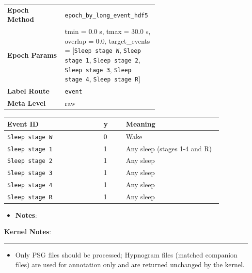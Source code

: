 {\begin{tcolorbox}
{\begin{tabular}{@{}lp{0.62\linewidth}@{}}
\textbf{Epoch Method} & \texttt{epoch\_by\_long\_event\_hdf5} \\
\textbf{Epoch Params} & tmin = 0.0 s, tmax = 30.0 s, overlap = 0.0, target\_events = [\texttt{Sleep stage W}, \texttt{Sleep stage 1}, \texttt{Sleep stage 2}, \texttt{Sleep stage 3}, \texttt{Sleep stage 4}, \texttt{Sleep stage R}] \\
\textbf{Label Route} & \texttt{event} \\
\textbf{Meta Level} & raw \\
\end{tabular}}
\par{}\par\smallskip
\begingroup\footnotesize
\begin{tabular}{@{}p{0.3911\linewidth}p{0.0978\linewidth}p{0.3911\linewidth}@{}}
\toprule
\textbf{Event ID} & \textbf{y} & \textbf{Meaning} \\
\midrule
\texttt{Sleep stage W} & 0 & Wake \\
\texttt{Sleep stage 1} & 1 & Any sleep (stages 1-4 and R) \\
\texttt{Sleep stage 2} & 1 & Any sleep \\
\texttt{Sleep stage 3} & 1 & Any sleep \\
\texttt{Sleep stage 4} & 1 & Any sleep \\
\texttt{Sleep stage R} & 1 & Any sleep \\
\bottomrule
\end{tabular}
\endgroup
\par{}\par
\begin{itemize}[leftmargin=1.3em,noitemsep,topsep=1pt]
\item[\scriptsize$\cdot$] {\scriptsize \textbf{Notes}:}
\end{itemize}
\par{} {\footnotesize \textbf{Kernel Notes}:}
\par\smallskip
\noindent\rule{\linewidth}{0.4pt}\par\nopagebreak
{}\par\smallskip
\begin{itemize}[leftmargin=1.4em,noitemsep,topsep=2pt]
\item{\footnotesize Only PSG files should be processed; Hypnogram files (matched companion files) are used for annotation only and are returned unchanged by the kernel.}

\end{itemize}
\end{tcolorbox}}
